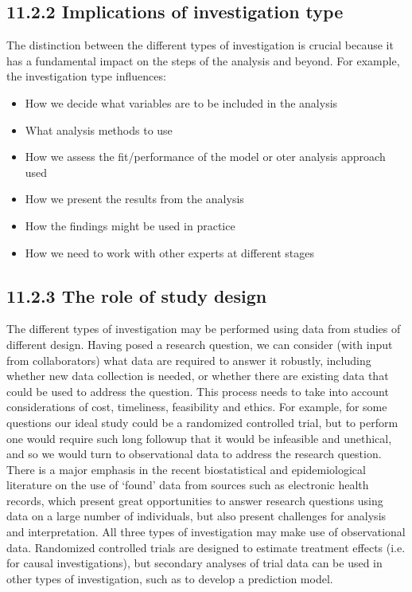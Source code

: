 \documentclass[letterpaper,10pt,english]{jupyterBook}
\begin{document}
\subsection{11.2.2 Implications of investigation type}
\label{\detokenize{11.c. Types of Investigation:implications-of-investigation-type}}
\sphinxAtStartPar
The distinction between the different types of investigation is crucial because it has a fundamental impact on the steps of the analysis and beyond. For example, the investigation type influences:
\begin{itemize}
\item {} 
\sphinxAtStartPar
How we decide what variables are to be included in the analysis

\item {} 
\sphinxAtStartPar
What analysis methods to use

\item {} 
\sphinxAtStartPar
How we assess the fit/performance of the model or oter analysis approach used

\item {} 
\sphinxAtStartPar
How we present the results from the analysis

\item {} 
\sphinxAtStartPar
How the findings might be used in practice

\item {} 
\sphinxAtStartPar
How we need to work with other experts at different stages

\end{itemize}


\subsection{11.2.3 The role of study design}
\label{\detokenize{11.c. Types of Investigation:the-role-of-study-design}}
\sphinxAtStartPar
The different types of investigation may be performed using data from studies of different design. Having posed a research question, we can consider (with input from collaborators) what data are required to answer it robustly, including whether new data collection is needed, or whether there are existing data that could be used to address the question. This process needs to take into account considerations of cost, timeliness, feasibility and ethics. For example, for some questions our ideal study could be a randomized controlled trial, but to perform one would require such long followup that it would be infeasible and unethical, and so we would turn to observational data to address the research question. There is a major emphasis in the recent biostatistical and epidemiological literature on the use of ‘found’ data from sources such as electronic health records, which present great opportunities to answer research questions using data on a large number of individuals, but also present challenges for analysis and interpretation. All three types of investigation may make use of observational data. Randomized controlled trials are designed to estimate treatment effects (i.e. for causal investigations), but secondary analyses of trial data can be used in other types of investigation, such as to develop a prediction model.
\end{document}
